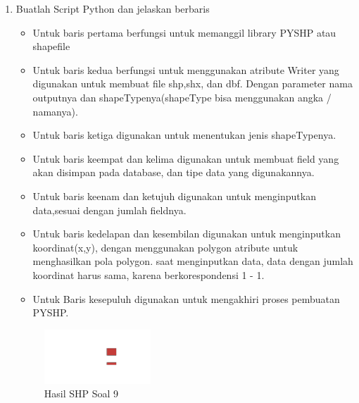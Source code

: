 \begin{enumerate}
	\item Buatlah Script Python dan jelaskan berbaris
	
	\begin{itemize}
		\item Untuk baris pertama berfungsi untuk memanggil library PYSHP atau shapefile
		\item Untuk baris kedua berfungsi untuk menggunakan atribute Writer yang digunakan untuk membuat file shp,shx, dan dbf. \hfill\break Dengan parameter nama outputnya dan shapeTypenya(shapeType bisa menggunakan angka / namanya).
		\item Untuk baris ketiga digunakan untuk menentukan jenis shapeTypenya.
		\item Untuk baris keempat dan kelima digunakan untuk membuat field yang akan disimpan pada database, dan tipe data yang digunakannya.
		\item Untuk baris keenam dan ketujuh digunakan untuk menginputkan data,sesuai dengan jumlah fieldnya.
		\item Untuk baris kedelapan dan kesembilan digunakan untuk menginputkan koordinat(x,y), dengan menggunakan polygon atribute untuk menghasilkan pola polygon. \hfill\break
		saat menginputkan data, data dengan jumlah koordinat harus sama, karena berkorespondensi 1 - 1.
		\item Untuk Baris kesepuluh digunakan untuk mengakhiri proses pembuatan PYSHP.
	\end{itemize}
	\hfill\break
	\begin{figure}[H]
		\includegraphics[width=4cm]{figures/1174095/2/9.png}
		\centering
		\caption{Hasil SHP Soal 9}
	\end{figure}


\end{enumerate}
